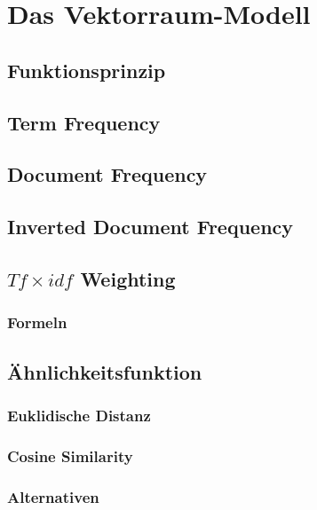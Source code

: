 \chapter{Das Vektorraum-Modell}
\label{vector}

\section{Funktionsprinzip}
\section{Term Frequency}
\section{Document Frequency}
\section{Inverted Document Frequency}
\section{$Tf \times idf$ Weighting}
\subsection{Formeln}

\section{\"Ahnlichkeitsfunktion}
\subsection{Euklidische Distanz}
\subsection{Cosine Similarity}
\subsection{Alternativen}
